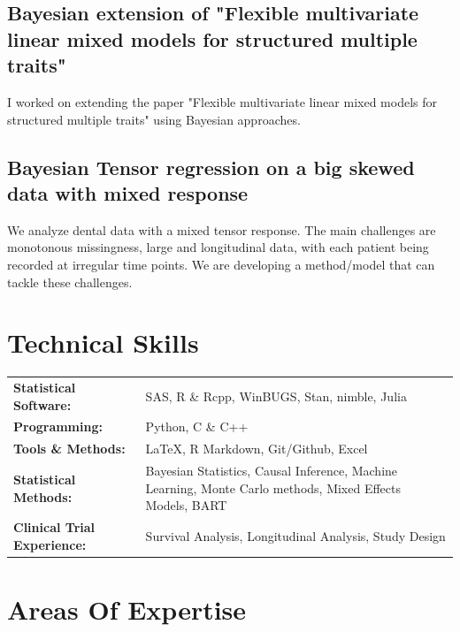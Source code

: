\documentclass[11pt,a4paper]{article}
\begin{document}
\subsection{Bayesian extension of "Flexible multivariate linear mixed models for structured multiple traits"}
I worked on extending the paper "Flexible multivariate linear mixed models for structured multiple traits" using Bayesian approaches.

\subsection{Bayesian Tensor regression on a big skewed data with mixed response}
We analyze dental data with a mixed tensor response. The main challenges are monotonous missingness, large and longitudinal data, with each patient being recorded at irregular time points. We are developing a method/model that can tackle these challenges.

\section{Technical Skills}

\begin{tabular}{@{} p{3.5cm} p{13cm} @{}}
\textbf{Statistical Software:} & SAS, R \& Rcpp, WinBUGS, Stan, nimble, Julia \\
\textbf{Programming:} & Python, C \& C++ \\
\textbf{Tools \& Methods:} & \LaTeX, R Markdown, Git/Github, Excel \\
\textbf{Statistical Methods:} & Bayesian Statistics, Causal Inference, Machine Learning, Monte Carlo methods, Mixed Effects Models, BART \\
\textbf{Clinical Trial Experience:} & Survival Analysis, Longitudinal Analysis, Study Design \\
\end{tabular}

\section{Areas Of Expertise}
\end{document}

